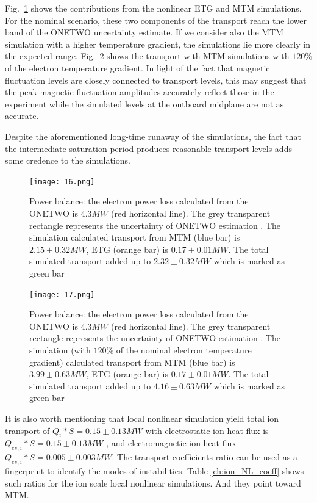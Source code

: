 \documentclass[
 aip,
 amsmath,amssymb,
 reprint
]{revtex4-1}
\begin{document}
Fig.~\ref{fig:power} shows the contributions from the nonlinear ETG and MTM simulations.  For the nominal scenario, these two components of the transport reach the lower band of the ONETWO uncertainty estimate.  If we consider also the MTM simulation with a higher temperature gradient, the simulations lie more clearly in the expected range. Fig.~\ref{fig:power_120} shows the transport with MTM simulations with $120\%$ of the electron temperature gradient.  In light of the fact that magnetic fluctuation levels are closely connected to transport levels, this may suggest that the peak magnetic fluctuation amplitudes accurately reflect those in the experiment while the simulated levels at the outboard midplane are not as accurate.   

Despite the aforementioned long-time runaway of the simulations, the fact that the intermediate saturation period produces reasonable transport levels adds some credence to the simulations.




\begin{figure}[ht]
        \texttt{[image: 16.png]}
        \centering
        \caption[font=5]{Power balance: the electron power loss calculated from the ONETWO is $4.3MW$ (red horizontal line). The  grey transparent rectangle represents the uncertainty of ONETWO estimation
        . The simulation calculated transport from MTM (blue bar) is $2.15\pm0.32MW$, ETG (orange bar) is $0.17\pm0.01MW$. The total simulated transport added up to $2.32\pm0.32MW$ which is marked as green bar}
        \label{fig:power}
\end{figure}

\begin{figure}[ht]
        \texttt{[image: 17.png]}
        \centering
        \caption[font=5]{Power balance: the electron power loss calculated from the ONETWO is $4.3MW$ (red horizontal line). The  grey transparent rectangle represents the uncertainty of ONETWO estimation
        . The simulation (with $120\%$ of the nominal electron temperature gradient) calculated transport from MTM (blue bar) is $3.99\pm0.63MW$, ETG (orange bar) is $0.17\pm0.01MW$. The total simulated transport added up to $4.16\pm0.63MW$ which is marked as green bar}
        \label{fig:power_120}
\end{figure}

It is also worth mentioning that local nonlinear simulation yield total ion transport of $Q_i*S = 0.15 \pm 0.13MW$ with electrostatic ion heat flux is $Q_{es,i}*S = 0.15 \pm 0.13M W$ , and electromagnetic ion heat flux $Q_{es,i}*S = 0.005 \pm 0.003MW$. The transport coefficients ratio can be used as a fingerprint \cite{Kotschenreuther_2019} to identify the modes of instabilities. Table \ref{ch:ion_NL_coeff} shows such ratios for the ion scale local nonlinear simulations. And they point toward MTM. 
\end{document}
